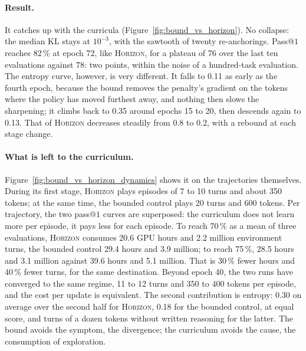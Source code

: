 \documentclass[11pt,a4paper]{article}
\begin{document}
\paragraph{Result.} It catches up with the curricula (Figure~\ref{fig:bound_vs_horizon}). No collapse: the median KL stays at $10^{-3}$, with the sawtooth of twenty re-anchorings. Pass@$1$ reaches 82\,\% at epoch 72, like \textsc{Horizon}, for a plateau of 76 over the last ten evaluations against 78: two points, within the noise of a hundred-task evaluation. The entropy curve, however, is very different. It falls to 0.11 as early as the fourth epoch, because the bound removes the penalty's gradient on the tokens where the policy has moved furthest away, and nothing then slows the sharpening; it climbs back to 0.35 around epochs 15 to 20, then descends again to 0.13. That of \textsc{Horizon} decreases steadily from 0.8 to 0.2, with a rebound at each stage change.

\paragraph{What is left to the curriculum.} Figure~\ref{fig:bound_vs_horizon_dynamics} shows it on the trajectories themselves. During its first stage, \textsc{Horizon} plays episodes of 7 to 10 turns and about 350 tokens; at the same time, the bounded control plays 20 turns and 600 tokens. Per trajectory, the two pass@$1$ curves are superposed: the curriculum does not learn more per episode, it pays less for each episode. To reach 70\,\% as a mean of three evaluations, \textsc{Horizon} consumes 20.6 GPU hours and 2.2 million environment turns, the bounded control 29.4 hours and 3.9 million; to reach 75\,\%, 28.5 hours and 3.1 million against 39.6 hours and 5.1 million. That is 30\,\% fewer hours and 40\,\% fewer turns, for the same destination. Beyond epoch 40, the two runs have converged to the same regime, 11 to 12 turns and 350 to 400 tokens per episode, and the cost per update is equivalent. The second contribution is entropy: 0.30 on average over the second half for \textsc{Horizon}, 0.18 for the bounded control, at equal score, and turns of a dozen tokens without written reasoning for the latter. The bound avoids the symptom, the divergence; the curriculum avoids the cause, the consumption of exploration.
\end{document}
